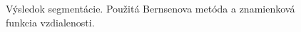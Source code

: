 \documentclass[a4paper,11pt,oneside]{article}%
\begin{document}
\begin{figure}[H]
    \hspace{5px}
    \hspace{5px}
    \caption{Výsledok segmentácie. Použitá Bernsenova metóda a znamienková funkcia vzdialenosti.}
    \label{fig:bernsen_sdf}
\end{figure}
\end{document}
